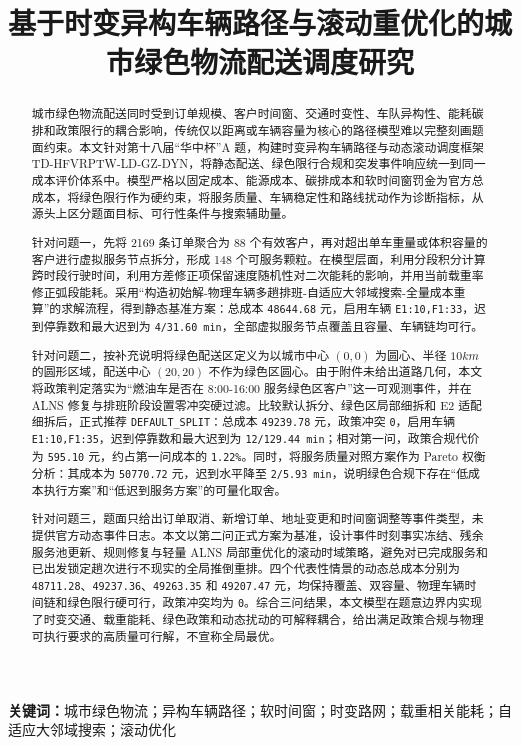 \documentclass[UTF8,zihao=-4,a4paper]{ctexart}
\title{基于时变异构车辆路径与滚动重优化的城市绿色物流配送调度研究}
\author{}
\date{}
\begin{document}
\maketitle
\vspace{-2em}


\begin{abstract}

城市绿色物流配送同时受到订单规模、客户时间窗、交通时变性、车队异构性、能耗碳排和政策限行的耦合影响，传统仅以距离或车辆容量为核心的路径模型难以完整刻画题面约束。本文针对第十八届“华中杯”A 题，构建时变异构车辆路径与动态滚动调度框架 TD-HFVRPTW-LD-GZ-DYN，将静态配送、绿色限行合规和突发事件响应统一到同一成本评价体系中。模型严格以固定成本、能源成本、碳排成本和软时间窗罚金为官方总成本，将绿色限行作为硬约束，将服务质量、车辆稳定性和路线扰动作为诊断指标，从源头上区分题面目标、可行性条件与搜索辅助量。

针对问题一，先将 2169 条订单聚合为 88 个有效客户，再对超出单车重量或体积容量的客户进行虚拟服务节点拆分，形成 148 个可服务颗粒。在模型层面，利用分段积分计算跨时段行驶时间，利用方差修正项保留速度随机性对二次能耗的影响，并用当前载重率修正弧段能耗。采用“构造初始解-物理车辆多趟排班-自适应大邻域搜索-全量成本重算”的求解流程，得到静态基准方案：总成本 \texttt{48644.68} 元，启用车辆 \texttt{E1:10,F1:33}，迟到停靠数和最大迟到为 \texttt{4/31.60 min}，全部虚拟服务节点覆盖且容量、车辆链均可行。

针对问题二，按补充说明将绿色配送区定义为以城市中心 \((0,0)\) 为圆心、半径 \(10 km\) 的圆形区域，配送中心 \((20,20)\) 不作为绿色区圆心。由于附件未给出道路几何，本文将政策判定落实为“燃油车是否在 8:00-16:00 服务绿色区客户”这一可观测事件，并在 ALNS 修复与排班阶段设置零冲突硬过滤。比较默认拆分、绿色区局部细拆和 E2 适配细拆后，正式推荐 \texttt{DEFAULT\_SPLIT}：总成本 \texttt{49239.78} 元，政策冲突 \texttt{0}，启用车辆 \texttt{E1:10,F1:35}，迟到停靠数和最大迟到为 \texttt{12/129.44 min}；相对第一问，政策合规代价为 \texttt{595.10} 元，约占第一问成本的 \texttt{1.22\%}。同时，将服务质量对照方案作为 Pareto 权衡分析：其成本为 \texttt{50770.72} 元，迟到水平降至 \texttt{2/5.93 min}，说明绿色合规下存在“低成本执行方案”和“低迟到服务方案”的可量化取舍。

针对问题三，题面只给出订单取消、新增订单、地址变更和时间窗调整等事件类型，未提供官方动态事件日志。本文以第二问正式方案为基准，设计事件时刻事实冻结、残余服务池更新、规则修复与轻量 ALNS 局部重优化的滚动时域策略，避免对已完成服务和已出发锁定趟次进行不现实的全局推倒重排。四个代表性情景的动态总成本分别为 \texttt{48711.28}、\texttt{49237.36}、\texttt{49263.35} 和 \texttt{49207.47} 元，均保持覆盖、双容量、物理车辆时间链和绿色限行硬可行，政策冲突均为 \texttt{0}。综合三问结果，本文模型在题意边界内实现了时变交通、载重能耗、绿色政策和动态扰动的可解释耦合，给出满足政策合规与物理可执行要求的高质量可行解，不宣称全局最优。

\end{abstract}
\noindent\textbf{关键词：}城市绿色物流；异构车辆路径；软时间窗；时变路网；载重相关能耗；自适应大邻域搜索；滚动优化
\clearpage
\tableofcontents
\clearpage
\end{document}
